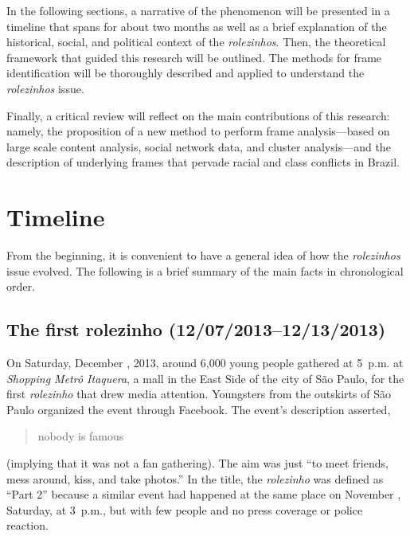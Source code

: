 In the following sections, a narrative of the phenomenon will be presented in a timeline that spans for about two months as well as a brief explanation of the historical, social, and political context of the \emph{rolezinhos}. Then, the theoretical framework that guided this research will be outlined. The methods for frame identification will be thoroughly described and applied to understand the \emph{rolezinhos} issue.

Finally, a critical review will reflect on the main contributions of this research: namely, the proposition of a new method to perform frame analysis---based on large scale content analysis, social network data, and cluster analysis---and the description of underlying frames that pervade racial and class conflicts in Brazil.

\section{Timeline}

From the beginning, it is convenient to have a general idea of how the \emph{rolezinhos} issue evolved. The following is a brief summary of the main facts in chronological order.

\subsection*{The first rolezinho (12/07/2013--12/13/2013)}

On Saturday, December , 2013, around 6,000 young people gathered at 5~p.m. at \emph{Shopping Metrô Itaquera}, a mall in the East Side of the city of São Paulo, for the first \emph{rolezinho} that drew media attention. Youngsters from the outskirts of São Paulo organized the event through Facebook. The event’s description asserted, \blockcquote{facebook_2013-12-07}{nobody  is famous} (implying that it was not a fan gathering). The aim was just \enquote{to meet friends, mess around, kiss, and take photos.} In the title, the \emph{rolezinho} was defined as \enquote{Part 2} because a similar event \autocite{facebook_2013-11-30} had happened at the same place on November , Saturday, at 3~p.m., but with few people and no press coverage or police reaction.

